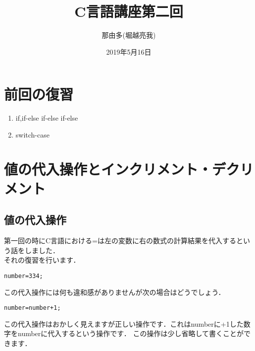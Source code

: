 \documentclass[a4j,titlepage,dvipdfmx]{jsarticle}   %
\title{C言語講座第二回}
\author{那由多(堀越亮我)}
\date{2019年5月16日}
\begin{document}
\maketitle
\section{前回の復習}
\begin{enumerate}
\item if,if-else if-else if-else
\item switch-case
\end{enumerate}
\section{値の代入操作とインクリメント・デクリメント}
\subsection{値の代入操作}
第一回の時にC言語における=は左の変数に右の数式の計算結果を代入するという話をしました．\\
それの復習を行います．
\begin{lstlisting}
number=334;
\end{lstlisting}
この代入操作には何も違和感がありませんが次の場合はどうでしょう．
\begin{lstlisting}
number=number+1;
\end{lstlisting}
この代入操作はおかしく見えますが正しい操作です．これはnumberに+1した数字をnumberに代入するという操作です．
この操作は少し省略して書くことができます．
\end{document}
